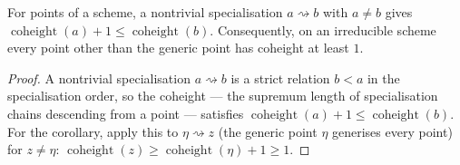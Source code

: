 \begin{lemma}
  \label{lem:coheight_strictness}
  \leanok
  For points of a scheme, a nontrivial specialisation \(a \rightsquigarrow b\)
  with \(a \neq b\) gives \(\operatorname{coheight}(a) + 1 \le
  \operatorname{coheight}(b)\). Consequently, on an irreducible scheme every point
  other than the generic point has coheight at least \(1\).
\end{lemma}
\begin{proof}
  \leanok
  A nontrivial specialisation \(a \rightsquigarrow b\) is a strict relation
  \(b < a\) in the specialisation order, so the coheight --- the supremum length
  of specialisation chains descending from a point --- satisfies
  \(\operatorname{coheight}(a) + 1 \le \operatorname{coheight}(b)\). For the
  corollary, apply this to \(\eta \rightsquigarrow z\) (the generic point \(\eta\)
  generises every point) for \(z \neq \eta\): \(\operatorname{coheight}(z) \ge
  \operatorname{coheight}(\eta) + 1 \ge 1\).
\end{proof}

